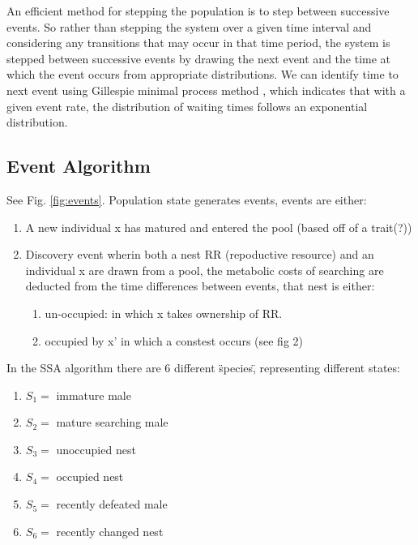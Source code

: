 \documentclass[a4paper,11pt]{article}
\begin{document}
An efficient method for stepping the population is to step between successive events. So rather than stepping the system over a given time interval and considering any transitions that may occur in that time period, the system is stepped between successive events by drawing the next event and the time at which the event occurs from appropriate distributions.  We can identify time to next event using Gillespie minimal process method \citep{Gillespie-1976}, which indicates that with a given event rate, the distribution of waiting times follows an exponential distribution.

\subsection{Event Algorithm}
See Fig. \ref{fig:events}. Population state generates events, events are either:
\begin{enumerate}
    \item A new individual x has matured and entered the pool (based off of a trait(?))
    \item Discovery event wherin both a nest RR (repoductive resource) and an individual x are drawn from a pool, the metabolic costs of searching are deducted from the time differences between events, that nest is either:
    \begin{enumerate}
        \item un-occupied: in which x takes ownership of RR.
        \item occupied by x' in which a constest occurs (see fig 2)
    \end{enumerate}
\end{enumerate}

In the SSA algorithm \citep{Gillespie-1976} there are 6 different \"species\", representing different states:
\begin{enumerate}
    \item $S_1 = $ immature male
    \item $S_2 = $ mature searching male
    \item $S_3 = $ unoccupied nest
    \item $S_4 = $ occupied nest
    \item $S_5 = $ recently defeated male
    \item $S_6 = $ recently changed nest
\end{enumerate}
\end{document}
